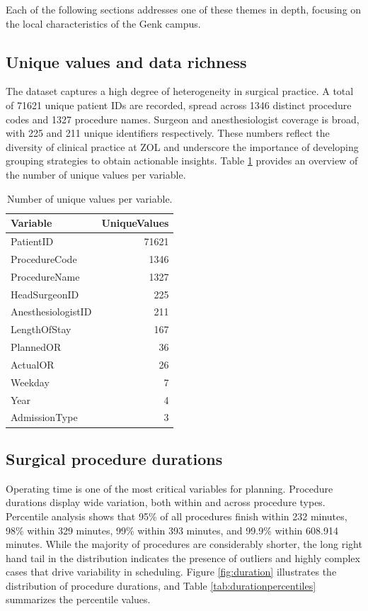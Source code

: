 \documentclass[
]{article}
\begin{document}
Each of the following sections addresses one of these themes in depth,
focusing on the local characteristics of the Genk campus.

\subsection{Unique values and data
richness}\label{unique-values-and-data-richness}

The dataset captures a high degree of heterogeneity in surgical
practice. A total of 71621 unique patient IDs are recorded, spread
across 1346 distinct procedure codes and 1327 procedure names. Surgeon
and anesthesiologist coverage is broad, with 225 and 211 unique
identifiers respectively. These numbers reflect the diversity of
clinical practice at ZOL and underscore the importance of developing
grouping strategies to obtain actionable insights. Table
\ref{tab:uniquevalues} provides an overview of the number of unique
values per variable.

\begin{table}[H]

\caption{\label{tab:unique values}Number of unique values per variable. \label{tab:uniquevalues}}
\centering
\begin{tabular}[t]{lr}
\toprule
Variable & UniqueValues\\
\midrule
PatientID & 71621\\
ProcedureCode & 1346\\
ProcedureName & 1327\\
HeadSurgeonID & 225\\
AnesthesiologistID & 211\\
\addlinespace
LengthOfStay & 167\\
PlannedOR & 36\\
ActualOR & 26\\
Weekday & 7\\
Year & 4\\
\addlinespace
AdmissionType & 3\\
\bottomrule
\end{tabular}
\end{table}

\subsection{Surgical procedure
durations}\label{surgical-procedure-durations}

Operating time is one of the most critical variables for planning.
Procedure durations display wide variation, both within and across
procedure types. Percentile analysis shows that 95\% of all procedures
finish within 232 minutes, 98\% within 329 minutes, 99\% within 393
minutes, and 99.9\% within 608.914 minutes. While the majority of
procedures are considerably shorter, the long right hand tail in the
distribution indicates the presence of outliers and highly complex cases
that drive variability in scheduling. Figure \ref{fig:duration}
illustrates the distribution of procedure durations, and Table
\ref{tab:durationpercentiles} summarizes the percentile values.
\end{document}
